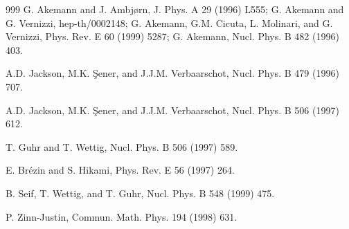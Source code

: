 \begin{thebibliography}{999}
     G. Akemann and J. Ambj{\o}rn, 
                      J. Phys. A 29 (1996) L555;            %
                      G. Akemann and G. Vernizzi, 
                      hep-th/0002148;                       %
                      G. Akemann, G.M. Cicuta, L. Molinari, and G. Vernizzi,
                      Phys. Rev. E 60 (1999) 5287;          %
                      G. Akemann, 
                      Nucl. Phys. B 482 (1996) 403.         %

      A.D. Jackson, M.K. \c Sener, and J.J.M. Verbaarschot,
                      Nucl. Phys. B 479 (1996) 707.         %

      A.D. Jackson, M.K. \c Sener, and J.J.M. Verbaarschot,
                      Nucl. Phys. B 506 (1997) 612.         %

      T. Guhr and T. Wettig, 
                      Nucl. Phys. B 506 (1997) 589.         %

      E. Br\'ezin and S. Hikami, 
                      Phys. Rev. E 56 (1997) 264.                %

      B. Seif, T. Wettig, and T. Guhr, 
                      Nucl. Phys. B 548 (1999) 475.         %

 P. Zinn-Justin, 
                      Commun. Math. Phys. 194 (1998) 631.   %


\end{thebibliography}
